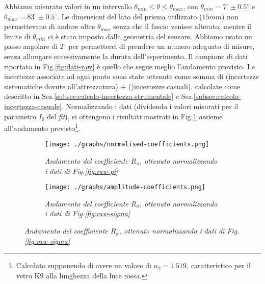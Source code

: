  Abbiamo misurato valori in un intervallo ${\theta_{min} \leq \theta \leq \theta_{max}}$,
  con ${\theta_{min} = 7^\circ \pm 0.5^\circ}$ e $\theta_{max} = 83^\circ \pm 0.5^\circ$.
  Le dimensioni del lato del prisma utilizzato ($15mm$) non permettevano
  di andare oltre $\theta_{max}$ senza che il fascio venisse alterato, mentre il
  limite di $\theta_{min}$ ci è stato imposto dalla geometria del sensore.
  Abbiamo usato un passo angolare di $2^\circ$ per permetterci di prendere un
  numero adeguato di misure, senza allungare eccessivamente la durata dell'esperimento.
  Il campione di dati riportato in Fig.\ref{fig:dati-raw} è quello che segue meglio
  l'andamento previsto.
  Le incertezze associate ad ogni punto sono state ottenute come somma di
  (incertezze sistematiche dovute all'attrezzatura) $+$ ()incertezze casuali), calcolate come
  descritto in Sez.\ref{subsec:calcolo-incertezza-strumentale} e Sez.\ref{subsec:calcolo-incertezza-casuale}.
  Normalizzando i dati (dividendo i valori misurati per il parametro $I_0$ del \emph{fit}), si ottengono i risultati mostrati in Fig.\ref{fig:normalised-coefficients}
  assieme all'andamento previsto\footnote{Calcolato supponendo di avere un valore di $n_2 = 1.519$, %
  caratteristico per il vetro K9 alla lunghezza della luce rossa.}.
  \begin{figure}[H]
    \centering
    \caption{Dati normalizzati}
    \begin{subfigure}{.4\textwidth}
      \texttt{[image: ./graphs/normalised-coefficients.png]}
      \caption{
        \emph{
          Andamento del coefficiente $R_\pi$, ottenuto normalizzando i dati
          di Fig.\ref{fig:raw-pi}
        }
      }
      \label{fig:normalised-coefficients}
    \end{subfigure}%
    \hspace{20mm}
    \begin{subfigure}{.4\textwidth}
      \texttt{[image: ./graphs/amplitude-coefficients.png]}
      \caption{
        \emph{
          Andamento del coefficiente $R_\sigma$, ottenuto normalizzando i dati
          di Fig.\ref{fig:raw-sigma}
        }
      }
      \label{fig:coefficienti-ampiezza}
    \end{subfigure}
  \end{figure}
%
